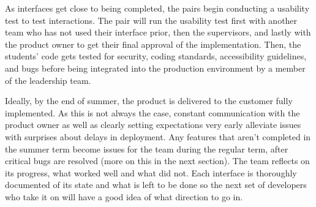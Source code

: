 
As interfaces get close to being completed, the pairs begin conducting a usability test \cite{usabilitytesting} to test interactions. The pair will run the usability test first with another team who has not used their interface prior, then the supervisors, and lastly with the product owner to get their final approval of the implementation. Then, the students’ code gets tested for security, coding standards, accessibility guidelines, and bugs before being integrated into the production environment by a member of the leadership team.


Ideally, by the end of summer, the product is delivered to the customer fully implemented. As this is not always the case, constant communication with the product owner as well as clearly setting expectations very early alleviate issues with surprises about delays in deployment. Any features that aren't completed in the summer term become issues for the team during the regular term, after critical bugs are resolved (more on this in the next section). The team reflects on its progress, what worked well and what did not. Each interface is thoroughly documented of its state and what is left to be done so the next set of developers who take it on will have a good idea of what direction to go in.

